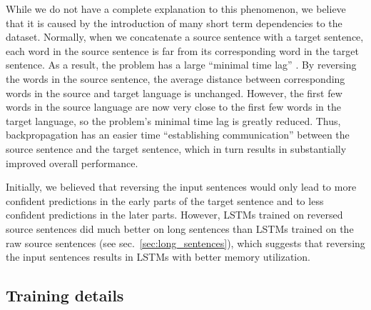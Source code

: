 \documentclass{article} \usepackage{nips14submit_e}
\begin{document}
While we do not have a complete explanation to this phenomenon, we
believe that it is caused by the introduction of many short term
dependencies to the dataset.  Normally, when we concatenate a source
sentence with a target sentence, each word in the source sentence is
far from its corresponding word in the target sentence. As a result,
the problem has a large ``minimal time lag'' \cite{minimal_time_lag}.  By reversing the
words in the source sentence, the average distance between
corresponding words in the source and target language is unchanged.
However, the first few words in the source language are now very close to
the first few words in the target language, so the problem's minimal
time lag is greatly reduced. Thus, backpropagation has an easier time
``establishing communication'' between the source sentence and the
target sentence, which in turn results in substantially improved overall
 performance.

Initially, we believed that reversing the input sentences would 
only lead to more confident predictions in the early parts of the target
sentence and to less confident predictions in the later parts.
However, LSTMs trained on reversed source sentences did much better on
long sentences than LSTMs trained on the raw source sentences (see
sec.~\ref{sec:long_sentences}), which suggests that reversing the
input sentences results in LSTMs with better memory utilization. 









\subsection{Training details}
\end{document}
